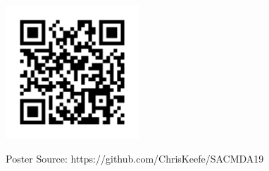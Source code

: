 \documentclass[final]{beamer}
\newlength{\sepwidth}
\newlength{\colwidth}
\newcommand{\separatorcolumn}{\begin{column}{\sepwidth}\end{column}}
\begin{document}
\begin{frame}[t]
\begin{columns}[t]
\begin{column}{\colwidth}
  \begin{figure}
    \begin{minipage}[c]{\textwidth}
      \hfill
      \includegraphics[height=5cm]{assets/repo}
    \end{minipage}
    \begin{minipage}[c]{\textwidth}
      \hfill
      Poster Source: https://github.com/ChrisKeefe/SACMDA19
    \end{minipage}
  \end{figure}

\end{column}

\separatorcolumn
\end{columns}
\end{frame}
\end{document}
